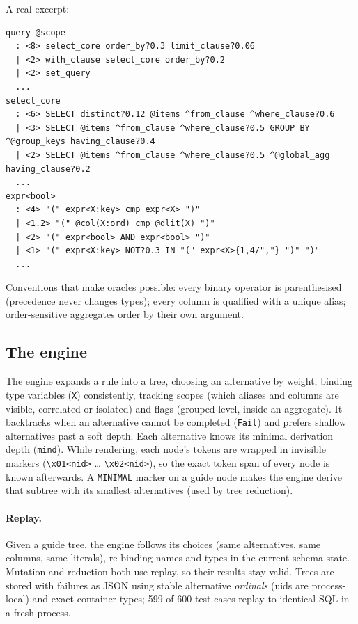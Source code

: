 A real excerpt:
\begin{lstlisting}
query @scope
  : <8> select_core order_by?0.3 limit_clause?0.06
  | <2> with_clause select_core order_by?0.2
  | <2> set_query
  ...
select_core
  : <6> SELECT distinct?0.12 @items ^from_clause ^where_clause?0.6
  | <3> SELECT @items ^from_clause ^where_clause?0.5 GROUP BY ^@group_keys having_clause?0.4
  | <2> SELECT @items ^from_clause ^where_clause?0.5 ^@global_agg having_clause?0.2
  ...
expr<bool>
  : <4> "(" expr<X:key> cmp expr<X> ")"
  | <1.2> "(" @col(X:ord) cmp @dlit(X) ")"
  | <2> "(" expr<bool> AND expr<bool> ")"
  | <1> "(" expr<X:key> NOT?0.3 IN "(" expr<X>{1,4/","} ")" ")"
  ...
\end{lstlisting}

Conventions that make oracles possible: every binary operator is
parenthesised (precedence never changes types); every column is qualified with
a unique alias; order-sensitive aggregates order by their own argument.

\subsection{The engine}

The engine expands a rule into a tree, choosing an alternative by weight,
binding type variables (\texttt{X}) consistently, tracking scopes (which
aliases and columns are visible, correlated or isolated) and flags (grouped
level, inside an aggregate). It backtracks when an alternative cannot be
completed (\texttt{Fail}) and prefers shallow alternatives past a soft depth.
Each alternative knows its minimal derivation depth (\texttt{mind}). While
rendering, each node's tokens are wrapped in invisible markers
(\verb|\x01<nid>| \dots{} \verb|\x02<nid>|), so the exact token span of every node
is known afterwards. A \texttt{MINIMAL} marker on a guide node makes the
engine derive that subtree with its smallest alternatives (used by tree
reduction).

\paragraph{Replay.} Given a guide tree, the engine follows its choices
(same alternatives, same columns, same literals), re-binding names and types
in the current schema state. Mutation and reduction both use replay, so their
results stay valid. Trees are stored with failures as JSON using stable
alternative \emph{ordinals} (uids are process-local) and exact container
types; 599 of 600 test cases replay to identical SQL in a fresh process.

